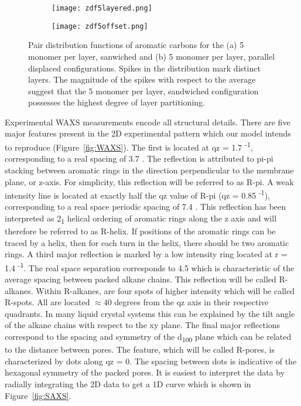 \begin{figure}[h]
	\centering
	\begin{subfigure}{0.45\textwidth}
		\centering
		\texttt{[image: zdf5layered.png]}
		\caption{}\label{fig:zdf_layered}
	\end{subfigure}
	\begin{subfigure}{0.45\textwidth}
		\centering
		\texttt{[image: zdf5offset.png]}
		\caption{}\label{fig:zdf_offset}
	\end{subfigure}
	\caption{Pair distribution functions of aromatic carbons for the
	(a) 5 monomer per layer, sanwiched and (b) 5 monomer per layer, 
	parallel displaced configurations. Spikes in the distribution mark
	distinct layers. The magnitude of the spikes with respect to the 
	average suggest that the 5 monomer per layer, sandwiched configuration
	possesses the highest degree of layer partitioning.}\label{fig:zdf}
\end{figure}

Experimental WAXS measurements encode all structural details. 
There are five major features present in the 2D experimental pattern which
our model intends to reproduce (Figure~\ref{fig:WAXS}). The first is located
at qz = 1.7 \angstrom \textsuperscript{-1}, corresponding to a real spacing 
of 3.7 \angstrom. The reflection is attributed to pi-pi stacking
between aromatic rings in the direction perpendicular to the membrane plane, or z-axis. 
For simplicity, this reflection will be referred to as R-pi. A weak intensity
line is located at exactly half the qz value of R-pi (qz = 0.85 \angstrom \textsuperscript{-1}), corresponding to a 
real space periodic spacing of 7.4 \angstrom. This reflection has been 
interpreted  as 2\textsubscript{1} helical ordering of aromatic rings along the
z axis and will therefore be referred to as R-helix. If positions of the 
aromatic rings can be traced by a helix, then for each turn in the helix, 
there should be two aromatic rings. A third major reflection is marked by 
a low intensity ring located at r = 1.4 \angstrom \textsuperscript{-1}. The
real space separation corresponds to 4.5 \angstrom which is characteristic
of the average spacing between packed alkane chains. This reflection will be
called R-alkanes. Within R-alkanes, are four spots of higher intensity which 
will be called R-spots. All are located $\approx 40$ degrees from the qz axis
in their respective quadrants. In many liquid crystal systems this can be
explained by the tilt angle of the alkane chains with respect to the xy plane. 
The final major reflections correspond to the spacing and symmetry of the d\textsubscript{100} 
plane which can be related to the distance between pores. The feature, which 
will be called R-pores, is characterized by dots along qz = 0. The spacing
between dots is indicative of the hexagonal symmetry of the packed pores. It
is easiest to interpret the data by radially integrating the 2D data to get 
a 1D curve which is shown in Figure~\ref{fig:SAXS}.

